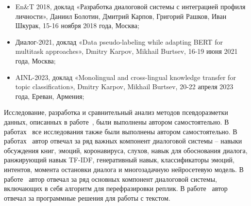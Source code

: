 {\probation}
\begin{itemize}
   \item En\&T 2018, доклад «Разработка диалоговой системы с интеграцией профиля личности», Даниил Болотин, Дмитрий Карпов, Григорий Рашков, Иван Шкурак, 15-16 ноября 2018 года, Москва;
   \item Диалог-2021, доклад «Data pseudo-labeling while adapting BERT for multitask approaches», Dmitry Karpov, Mikhail Burtsev, 16-19 июня 2021 года, Москва;
   \item AINL-2023, доклад «Monolingual and cross-lingual knowledge transfer for topic classification», Dmitry Karpov, Mikhail Burtsev, 20-22 апреля 2023 года, Ереван, Армения;
\end{itemize}%


{\contribution} Исследование, разработка и сравнительный анализ методов псевдоразметки данных, описанных в работе~\cite{pseudolabel}, были выполнены автором самостоятельно.  В работах~\cite{rumtl,rutopics} все исследования также были выполнены автором самостоятельно. В работах~\cite{dream1,dream1_trudy,dream2,mtldream} автор отвечал за ряд важных компонент диалоговой системы -- навыки обсуждения книг, эмоций, коронавируса, слухов, навык для обоснования диалога, ранжирующий навык TF-IDF, генеративный навык, классификаторы эмоций, интентов, момента остановки диалога и многозадачную нейросетевую модель. В работе~\cite{Болотин_Карпов_Рашков_Шкурак_2019} автор отвечал за ряд основных компонент диалоговой системы, включающих в себя алгоритм для перефразировки реплик. В работе~\cite{Дуплякин_Дмитрий_Ондар_Ушаков_2021} автор отвечал за программные решения для работы с текстом. 

